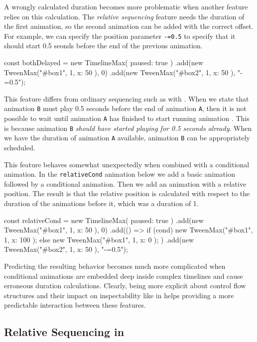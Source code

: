 A wrongly calculated duration becomes more problematic when another feature relies on this calculation. The \emph{relative sequencing} feature needs the duration of the first animation, so the second animation can be added with the correct offset. For example, we can specify the position parameter \texttt{-=0.5} to specify that it should start 0.5 seonds before the end of the previous animation.

\begin{js}
const bothDelayed = new TimelineMax({ paused: true })
  .add(new TweenMax("#box1", 1, { x: 50 }), 0)
  .add(new TweenMax("#box2", 1, { x: 50 }), "-=0.5");
\end{js}


This feature differs from ordinary sequencing such as with . When we state that animation \texttt{B} must play 0.5 seconds before the end of animation \texttt{A}, then it is not possible to wait until animation \texttt{A} has finished to start running animation . This is because animation \texttt{B} \emph{should have started playing for 0.5 seconds already}. When we have the duration of animation \texttt{A} available, animation \texttt{B} can be appropriately scheduled.

This feature behaves somewhat unexpectedly when combined with a
conditional animation. In the \texttt{relativeCond} animation below we add a
basic animation followed by a conditional animation. Then we add an animation
with a relative position. The result is that the relative position is
calculated with respect to the duration of the animations before it, which was
a duration of 1.

\begin{js}
const relativeCond = new TimelineMax({ paused: true })
  .add(new TweenMax("#box1", 1, { x: 50 }), 0)
  .add(() => { if (cond) { new TweenMax("#box1", 1, { x: 100 });
               } else { new TweenMax("#box1", 1, { x: 0 }); } })
  .add(new TweenMax("#box2", 1, { x: 50 }), "-=0.5");
\end{js}

Predicting the resulting behavior becomes much more complicated when
conditional animations are embedded deep inside complex timelines and cause
erroneous duration calculations.  Clearly, being more explicit about control
flow structures and their impact on inspectability like in \dsl{} helps
providing a more predictable interaction between these features.

\subsection{Relative Sequencing in \dsl{}}

